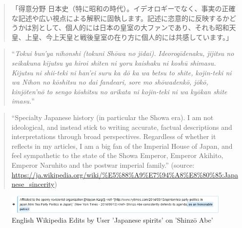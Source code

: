 \documentclass[10pt,british,A4paper,,openany]{memoir}
\begin{document}
\begin{quote}
「得意分野\newline
日本史（特に昭和の時代）。イデオロギーでなく、事実の正確な記述や広い視点による解釈に固執します。記述に恣意的に反映するかどうかは別として、個人的には日本の皇室の大ファンであり、それも昭和天皇、上皇、今上天皇と戦後皇室の在り方に個人的には共感しています。」
\end{quote}

\begin{quote}
``\emph{Tokui bun'ya\newline
nihonshi (tokuni Shōwa no jidai). Ideorogīdenaku, jijitsu no seikakuna
kijutsu ya hiroi shiten ni yoru kaishaku ni koshū shimasu. Kijutsu ni
shii-teki ni han'ei suru ka dō ka wa betsu to shite, kojin-teki ni wa
Nihon no kōshitsu no dai fandeari, sore mo shōwadenkō, jōkō, kinjōten'nō
to sengo kōshitsu no arikata ni kojin-teki ni wa kyōkan shite imasu.}''
\end{quote}

\begin{quote}
``Specialty\newline
Japanese history (in particular the Showa era). I am not ideological,
and instead stick to writing accurate, factual descriptions and
interpretations through broad perspectives. Regardless of whether it
reflects in my articles, I am a big fan of the Imperial House of Japan,
and feel sympathetic to the state of the Showa Emperor, Emperor Akihito,
Emperor Naruhito and the postwar imperial family.'' (source:
\url{https://ja.wikipedia.org/wiki/\%E5\%88\%A9\%E7\%94\%A8\%E8\%80\%85:Japanese_sincerity})
\end{quote}

\begin{figure}[!htb]
 \centering
 \includegraphics[width=.9\textwidth]{images/wiki/japanese-spirits-abe.jpg}
 \centering\caption{English Wikipedia Edits by User 'Japanese spirits' on 'Shinzō Abe'}\label{fig:js-abe}
\end{figure}
\end{document}
